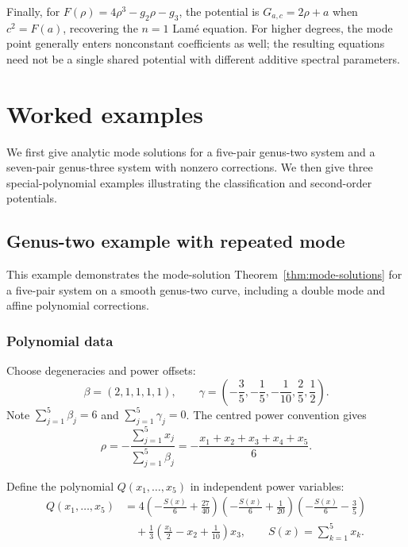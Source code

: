 \documentclass[11pt]{article}
\begin{document}
Finally, for $F(\rho)=4\rho^3-g_2\rho-g_3$, the potential is
$G_{a,c}=2\rho+a$ when $c^2=F(a)$, recovering the $n=1$ Lam\'e equation.
For higher degrees, the mode point generally enters nonconstant
coefficients as well; the resulting equations need not be a single
shared potential with different additive spectral parameters.

\section{Worked examples}\label{sec:examples}

We first give analytic mode solutions for a five-pair genus-two system and a seven-pair genus-three system with nonzero corrections. We then give three special-polynomial examples illustrating the classification and second-order potentials.

\subsection{Genus-two example with repeated mode}

This example demonstrates the mode-solution Theorem~\ref{thm:mode-solutions}
for a five-pair system on a smooth genus-two curve, including a double
mode and affine polynomial corrections.

\subsubsection{Polynomial data}

Choose degeneracies and power offsets:
\begin{equation}\label{ex:g2-data}
\beta = (2,1,1,1,1), \qquad \gamma = \left(-\frac{3}{5},-\frac{1}{5},-\frac{1}{10},\frac{2}{5},\frac{1}{2}\right).
\end{equation}
Note $\sum_{j=1}^{5}\beta_j = 6$ and $\sum_{j=1}^{5}\gamma_j = 0$. The centred power convention gives
\[
\rho = -\frac{\sum_{j=1}^{5} x_j}{\sum_{j=1}^{5} \beta_j} = -\frac{x_1+x_2+x_3+x_4+x_5}{6}.
\]

Define the polynomial $Q(x_1,\ldots,x_5)$ in independent power variables:
\begin{equation}\label{ex:g2-Q}
\begin{aligned}
Q(x_1,\ldots,x_5)&=4\left(-\frac{S(x)}6+\frac{27}{40}\right)\left(-\frac{S(x)}6+\frac1{20}\right)\left(-\frac{S(x)}6-\frac35\right)\\
&\quad+\frac13\left(\frac{x_1}{2}-x_2+\frac1{10}\right)x_3,
\qquad S(x)=\sum_{k=1}^{5}x_k.
\end{aligned}
\end{equation}
\end{document}
